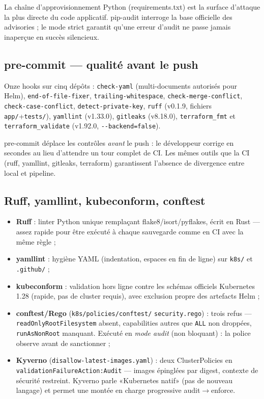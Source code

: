 \documentclass[11pt,a4paper]{article}
\begin{document}
\begin{whybox}
La chaîne d'approvisionnement Python (requirements.txt) est la surface d'attaque la plus directe du code applicatif. pip-audit interroge la base officielle des advisories ; le mode strict garantit qu'une erreur d'audit ne passe jamais inaperçue en succès silencieux.
\end{whybox}

\subsection{pre-commit --- qualité avant le push}
Onze hooks sur cinq dépôts : \texttt{check-yaml} (multi-documents autorisés pour Helm), \texttt{end-of-file-fixer}, \texttt{trailing-whitespace}, \texttt{check-merge-conflict}, \texttt{check-case-conflict}, \texttt{detect-private-key}, \texttt{ruff} (v0.1.9, fichiers \texttt{app/}+\texttt{tests/}), \texttt{yamllint} (v1.33.0), \texttt{gitleaks} (v8.18.0), \texttt{terraform\_fmt} et \texttt{terraform\_validate} (v1.92.0, \texttt{-{}-backend=false}).

\begin{whybox}
pre-commit déplace les contrôles \emph{avant} le push : le développeur corrige en secondes au lieu d'attendre un tour complet de CI. Les mêmes outils que la CI (ruff, yamllint, gitleaks, terraform) garantissent l'absence de divergence entre local et pipeline.
\end{whybox}

\subsection{Ruff, yamllint, kubeconform, conftest}\label{sec:policies}
\begin{itemize}[itemsep=2pt]
  \item \textbf{Ruff} : linter Python unique remplaçant flake8/isort/pyflakes, écrit en Rust --- assez rapide pour être exécuté à chaque sauvegarde comme en CI avec la même règle ;
  \item \textbf{yamllint} : hygiène YAML (indentation, espaces en fin de ligne) sur \texttt{k8s/} et \texttt{.github/} ;
  \item \textbf{kubeconform} : validation hors ligne contre les schémas officiels Kubernetes 1.28 (rapide, pas de cluster requis), avec exclusion propre des artefacts Helm ;
  \item \textbf{conftest/Rego} (\texttt{k8s/policies/conftest/} \texttt{security.rego}) : trois refus --- \texttt{readOnlyRootFilesystem} absent, capabilities autres que \texttt{ALL} non droppées, \texttt{runAsNonRoot} manquant. Exécuté en \emph{mode audit} (non bloquant) : la police observe avant de sanctionner ;
  \item \textbf{Kyverno} (\texttt{disallow-latest-images.yaml}) : deux ClusterPolicies en \texttt{validationFailure\allowbreak Action:\allowbreak Audit} --- images épinglées par digest, contexte de sécurité restreint. Kyverno parle «Kubernetes natif» (pas de nouveau langage) et permet une montée en charge progressive audit$\rightarrow$enforce.
\end{itemize}
\end{document}

